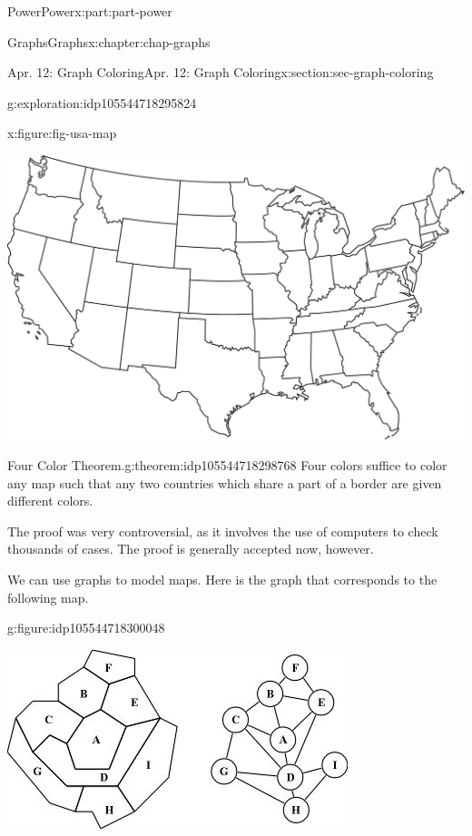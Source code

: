 \documentclass[oneside,10pt,]{book}
\numberwithin{equation}{section}
\begin{document}
\begin{partptx}{Power}{}{Power}{}{}{x:part:part-power}
\begin{chapterptx}{Graphs}{}{Graphs}{}{}{x:chapter:chap-graphs}
\begin{sectionptx}{Apr. 12: Graph Coloring}{}{Apr. 12: Graph Coloring}{}{}{x:section:sec-graph-coloring}
\begin{exploration}{}{g:exploration:idp105544718295824}
\begin{figureptx}{}{x:figure:fig-usa-map}{}
\begin{image}{0.175}{0.65}{0.175}
\includegraphics[width=\linewidth]{./images/usa.jpg}
\end{image}%
\tcblower
\end{figureptx}%
\end{exploration}%
%
\begin{theorem}{Four Color Theorem.}{}{g:theorem:idp105544718298768}%
Four colors suffice to color any map such that any two countries which share a part of a border are given different colors.%
\end{theorem}
The proof was very controversial, as it involves the use of computers to check thousands of cases. The proof is generally accepted now, however.%
\par
We can use graphs to model maps. Here is the graph that corresponds to the following map.%
\begin{figureptx}{}{g:figure:idp105544718300048}{}%
\begin{image}{0.25}{0.5}{0.25}%
\includegraphics[width=\linewidth]{./images/map1.jpg}
\end{image}%

\end{figureptx}
\end{sectionptx}
\end{chapterptx}
\end{partptx}
\end{document}
